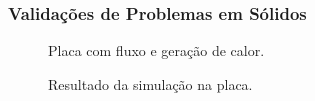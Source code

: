 \documentclass{beamer}
\begin{document}
\begin{frame}
  \frametitle{Validações de Problemas em Sólidos}
  
  \begin{minipage}{.48\textwidth}
    \centering
    \begin{figure}
       {\raggedleft \tiny Placa com fluxo e geração de calor.}
    \end{figure}
  \end{minipage}
  \hfill
  \begin{minipage}{.48\textwidth}
    \begin{figure}
       {\raggedleft \tiny Resultado da simulação na placa.}
    \end{figure}
  \end{minipage}
  

\end{frame}
\end{document}
